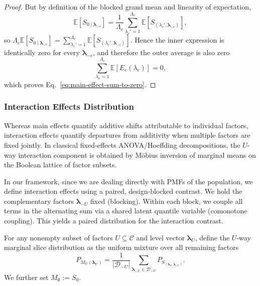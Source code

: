 \begin{proof}
But by definition of the blocked grand mean and linearity of expectation,
\[
\mathbb{E}[S_{0\mid \boldsymbol{\lambda}_{-c}}]
=
\frac{1}{\Lambda_c}\sum_{\lambda_c'=1}^{\Lambda_c}
\mathbb{E}[S_{(\lambda_c',\boldsymbol{\lambda}_{-c})}],
\]
so
$\Lambda_c \mathbb{E}[S_{0\mid \boldsymbol{\lambda}_{-c}}]
=
\sum_{\lambda_c'=1}^{\Lambda_c}\mathbb{E}[S_{(\lambda_c',\boldsymbol{\lambda}_{-c})}]$.
Hence the inner expression is identically zero for every
$\boldsymbol{\lambda}_{-c}$, and therefore the outer average is also zero
\[
\sum_{\lambda_c=1}^{\Lambda_c}\mathbb{E}\!\left[E_c(\lambda_c)\right] = 0,
\]
which proves Eq.~\eqref{eq:main-effect-sum-to-zero}.
\end{proof}



\subsubsection{Interaction Effects Distribution}
\label{app:interactions}

Whereas main effects quantify additive shifts attributable to individual factors,
interaction effects quantify departures from additivity when multiple factors
are fixed jointly. In classical fixed-effects ANOVA/Hoeffding decompositions,
the $U$-way interaction component is obtained by M\"obius inversion of marginal
means on the Boolean lattice of factor subsets.

In our framework, since we are dealing directly with PMFs of the population,
we define interaction effects using a
paired, design-blocked contrast.
We hold the complementary factors $\boldsymbol{\lambda}_{-U}$ fixed (blocking).
Within each block, we couple all terms in the alternating sum via a
shared latent quantile variable (comonotone coupling). 
This yields a paired distribution for the interaction contrast.

For any nonempty subset of factors $U \subseteq \mathcal{C}$ and level vector
$\boldsymbol{\lambda}_U$, define the $U$-way marginal slice distribution as the
uniform mixture over all remaining factors
\begin{equation}
\label{eq:marginal-slice-U}
P_{M_U(\boldsymbol{\lambda}_U)}
=
\frac{1}{|\mathcal{D}_{-U}|}
\sum_{\boldsymbol{\lambda}_{-U}\in\mathcal{D}_{-U}}
P_{S_{(\boldsymbol{\lambda}_U,\boldsymbol{\lambda}_{-U})}}.
\end{equation}
We further set $M_\emptyset := S_0$.



